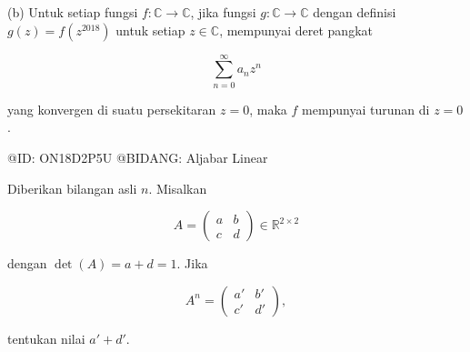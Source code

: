 (b) Untuk setiap fungsi $f:\mathbb C\to\mathbb C$, jika fungsi $g:\mathbb C\to\mathbb C$ dengan definisi $g(z)=f(z^{2018})$ untuk setiap $z\in\mathbb C$, mempunyai deret pangkat

$$
\sum_{n=0}^{\infty}a_nz^n
$$

yang konvergen di suatu persekitaran $z=0$, maka $f$ mempunyai turunan di $z=0$.

@ID: ON18D2P5U
@BIDANG: Aljabar Linear

Diberikan bilangan asli $n$. Misalkan

$$
A=
\begin{pmatrix}
a&b\\
c&d
\end{pmatrix}
\in\mathbb R^{2\times2}
$$

dengan $\det(A)=a+d=1$. Jika

$$
A^n=
\begin{pmatrix}
a'&b'\\
c'&d'
\end{pmatrix},
$$

tentukan nilai $a'+d'$.